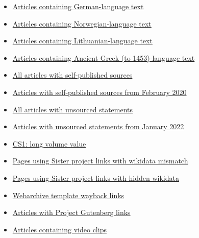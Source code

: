 \documentclass[11pt,a4paper]{article}
\begin{document}
\begin{itemize}
\item \href{/wiki/Category:Articles\_containing\_German-language\_text}{Articles containing German-language text}
\item \href{/wiki/Category:Articles\_containing\_Norwegian-language\_text}{Articles containing Norwegian-language text}
\item \href{/wiki/Category:Articles\_containing\_Lithuanian-language\_text}{Articles containing Lithuanian-language text}
\item \href{/wiki/Category:Articles\_containing\_Ancient\_Greek\_(to\_1453)-language\_text}{Articles containing Ancient Greek (to 1453)-language text}
\item \href{/wiki/Category:All\_articles\_with\_self-published\_sources}{All articles with self-published sources}
\item \href{/wiki/Category:Articles\_with\_self-published\_sources\_from\_February\_2020}{Articles with self-published sources from February 2020}
\item \href{/wiki/Category:All\_articles\_with\_unsourced\_statements}{All articles with unsourced statements}
\item \href{/wiki/Category:Articles\_with\_unsourced\_statements\_from\_January\_2022}{Articles with unsourced statements from January 2022}
\item \href{/wiki/Category:CS1:\_long\_volume\_value}{CS1: long volume value}
\item \href{/wiki/Category:Pages\_using\_Sister\_project\_links\_with\_wikidata\_mismatch}{Pages using Sister project links with wikidata mismatch}
\item \href{/wiki/Category:Pages\_using\_Sister\_project\_links\_with\_hidden\_wikidata}{Pages using Sister project links with hidden wikidata}
\item \href{/wiki/Category:Webarchive\_template\_wayback\_links}{Webarchive template wayback links}
\item \href{/wiki/Category:Articles\_with\_Project\_Gutenberg\_links}{Articles with Project Gutenberg links}
\item \href{/wiki/Category:Articles\_containing\_video\_clips}{Articles containing video clips}
\end{itemize}
\end{document}
